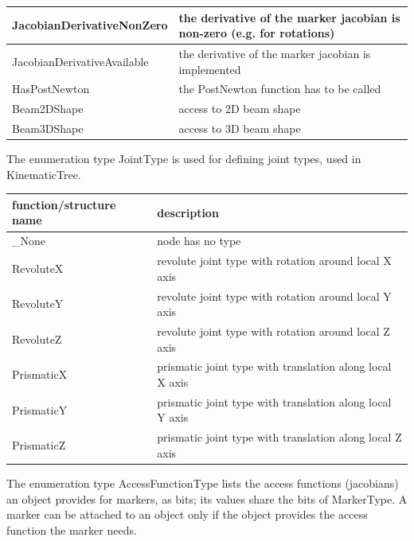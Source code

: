 \begin{center}
\begin{longtable}{| p{8cm} | p{8cm} |}
  JacobianDerivativeNonZero & the derivative of the marker jacobian is non-zero (e.g. for rotations)\\ \hline  
  JacobianDerivativeAvailable & the derivative of the marker jacobian is implemented\\ \hline  
  HasPostNewton & the PostNewton function has to be called\\ \hline  
  Beam2DShape & access to 2D beam shape\\ \hline  
  Beam3DShape & access to 3D beam shape\\ \hline  
\end{longtable}
\end{center}

\label{sec:JointType}
The enumeration type  JointType is used for defining joint types, used in KinematicTree.



\begin{center}
\footnotesize
\begin{longtable}{| p{8cm} | p{8cm} |} 
\hline
{\bf function/structure name} & {\bf description}\\ \hline
  \_None & node has no type\\ \hline  
  RevoluteX & revolute joint type with rotation around local X axis\\ \hline  
  RevoluteY & revolute joint type with rotation around local Y axis\\ \hline  
  RevoluteZ & revolute joint type with rotation around local Z axis\\ \hline  
  PrismaticX & prismatic joint type with translation along local X axis\\ \hline  
  PrismaticY & prismatic joint type with translation along local Y axis\\ \hline  
  PrismaticZ & prismatic joint type with translation along local Z axis\\ \hline  
\end{longtable}
\end{center}

\label{sec:AccessFunctionType}
The enumeration type AccessFunctionType lists the access functions (jacobians) an object provides for markers, as bits; its values share the bits of MarkerType. A marker can be attached to an object only if the object provides the access function the marker needs.



